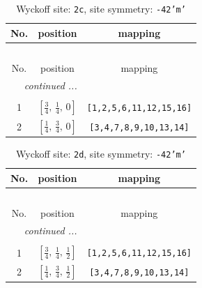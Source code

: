 \documentclass[fleqn,8pt]{jsarticle}
\begin{document}
\renewcommand{\arraystretch}{1.2}
\begin{longtable}{ccc}
\caption{Wyckoff site: {\tt 2c}, site symmetry: {\tt -42'm'}}
 \\
 \hline \hline
No. & position & mapping \\ \hline \endfirsthead

\multicolumn{2}{l}{\tablename\ \thetable{}} \\
 \hline \hline
No. & position & mapping \\ \hline \endhead

 \hline \hline
\multicolumn{2}{r}{\footnotesize\it continued ...} \\ \endfoot

 \hline \hline
\multicolumn{2}{r}{} \\ \endlastfoot

1 & $\left[ \frac{3}{4},\, \frac{1}{4},\, 0 \right]$ & {\tt [1,2,5,6,11,12,15,16]} \\ \hline
2 & $\left[ \frac{1}{4},\, \frac{3}{4},\, 0 \right]$ & {\tt [3,4,7,8,9,10,13,14]} \\
\end{longtable}
\renewcommand{\arraystretch}{1.2}
\begin{longtable}{ccc}
\caption{Wyckoff site: {\tt 2d}, site symmetry: {\tt -42'm'}}
 \\
 \hline \hline
No. & position & mapping \\ \hline \endfirsthead

\multicolumn{2}{l}{\tablename\ \thetable{}} \\
 \hline \hline
No. & position & mapping \\ \hline \endhead

 \hline \hline
\multicolumn{2}{r}{\footnotesize\it continued ...} \\ \endfoot

 \hline \hline
\multicolumn{2}{r}{} \\ \endlastfoot

1 & $\left[ \frac{3}{4},\, \frac{1}{4},\, \frac{1}{2} \right]$ & {\tt [1,2,5,6,11,12,15,16]} \\ \hline
2 & $\left[ \frac{1}{4},\, \frac{3}{4},\, \frac{1}{2} \right]$ & {\tt [3,4,7,8,9,10,13,14]} \\
\end{longtable}
\renewcommand{\arraystretch}{1.2}
\end{document}
